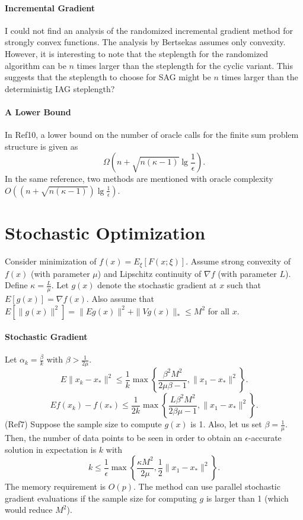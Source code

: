 \documentclass{article}
\begin{document}
\paragraph{Incremental Gradient} I could not find an analysis of the randomized incremental gradient method for strongly convex functions.  The analysis by Bertsekas assumes only convexity.  However, it is interesting to note that the steplength for the randomized algorithm can be $n$ times larger than the steplength for the cyclic variant.  This suggests that the steplength to choose for SAG might be $n$ times larger than the deterministig IAG steplength?


\paragraph{A Lower Bound} In Ref10, a lower bound on the number of oracle calls for the finite sum problem structure is given as
\[
 \Omega\left( n + \sqrt{n(\kappa-1)}\lg\frac{1}{\epsilon}\right).
\]
In the same reference, two methods are mentioned with oracle complexity $O\left(\left(n+\sqrt{n(\kappa-1)}\right)\lg\frac{1}{\epsilon}\right)$.
 
 \bigskip\bigskip
 
 \section{Stochastic Optimization}
 
 Consider minimization of $f(x)=E_\xi [F(x;\xi)]$.  Assume strong convexity of $f(x)$ (with parameter $\mu$) and Lipschitz continuity of $\nabla f$ (with parameter $L$).  Define $\kappa=\frac{L}{\mu}$.  Let $g(x)$ denote the stochastic gradient at $x$ such that $E[g(x)]=\nabla f(x)$.  Also assume that $E[\|g(x)\|^2]=\|Eg(x)\|^2+\|Vg(x)\|_\ast \leq M^2$ for all $x$.
 
 \paragraph{Stochastic Gradient}  Let $\alpha_k = \displaystyle\frac{\beta}{k}$ with $\beta > \displaystyle\frac{1}{2\mu}$.
 \[
  E\|x_k-x_\ast\|^2 \leq \frac{1}{k}\max\left\lbrace\frac{\beta^2M^2}{2\mu\beta-1},\|x_1-x_\ast\|^2\right\rbrace. 
 \]
  \[
  Ef(x_k)-f(x_\ast) \leq \frac{1}{2k}\max\left\lbrace\frac{L\beta^2M^2}{2\beta\mu-1},\|x_1-x_\ast\|^2\right\rbrace. 
 \]
 (Ref7)  Suppose the sample size to compute $g(x)$ is 1.  Also, let us set $\beta = \frac{1}{\mu}$. Then, the number of data points to be seen in order to obtain an $\epsilon$-accurate solution in expectation is $k$ with
 \[
    k \leq \frac{1}{\epsilon}\max\left\lbrace\frac{\kappa M^2}{2\mu},\frac{1}{2}\|x_1-x_\ast\|^2\right\rbrace.
 \]
 The memory requirement is $O(p)$.  The method can use parallel stochastic gradient evaluations if the sample size for computing $g$ is larger than 1 (which would reduce $M^2$).
 
\end{document}

